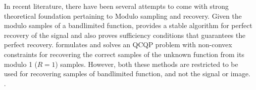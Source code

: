 In recent literature, there have been several attempts to come with strong theoretical foundation pertaining to Modulo sampling and recovery.  Given the modulo samples of a bandlimited function, \cite{Bhandari} provides a stable algorithm for perfect recovery of the signal and also proves sufficiency conditions that guarantees the perfect recovery. \cite{Cucuringu2017} formulates and solves an QCQP problem with non-convex constraints for recovering the correct samples of the unknown function from its modulo 1 ($R =1$) samples. However, both these methods are restricted to be used for recovering samples of bandlimited function, and not the signal or image. .
